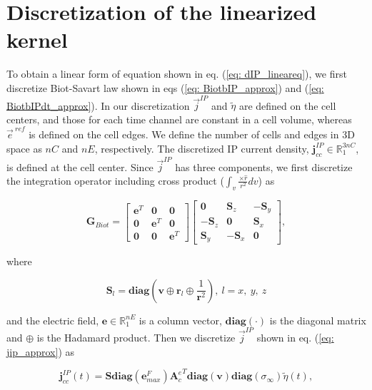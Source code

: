\documentclass[extra,mreferee]{gji}
\newcommand{\siginf}{\sigma_\infty}
\newcommand{\Ace}{{\mathbf A_c^e}}
\newcommand{\diag}{\mathbf{diag}}
\renewcommand {\j}  { {\vec j} }
\newcommand {\e}  { {\vec e} }
\renewcommand {\dj}  { {\mathbf{j} } }
\newcommand {\de}  { {\mathbf{e} } }
\newcommand{\vol}{\mathbf{v}}
\newcommand{\peta}{\tilde{\eta}}
\newcommand{\eref}{\e^{\ ref}}
\begin{document}
\section{Discretization of the linearized kernel}
\label{section:linearkernel_discrete}
To obtain a linear form of equation shown in eq. (\ref{eq: dIP_lineareq}),
we first discretize Biot-Savart law shown in eqs (\ref{eq: BiotbIP_approx}) and (\ref{eq: BiotbIPdt_approx}). In our discretization $\j^{IP}$ and  $\peta$ are defined on the cell centers, and those for each time channel are constant in a cell volume, whereas $\eref$ is defined on the cell edges. 
We define the number of cells and edges in 3D space as $nC$ and $nE$, respectively. The discretized IP current density, $\dj^{IP}_{cc} \in \mathbb{R}^{3nC}_{1}$, is defined at the cell center. Since $\j^{IP}$ has three components, we first discretize the integration operator including cross product ($\int_{v}\frac{ \times \hat{r}}{r^2}dv$) as
\begin{linenomath*}
\begin{equation}
  \mathbf{G}_{Biot} =
  \begin{bmatrix}
       \mathbf{e}^T &  \mathbf{0}   & \mathbf{0}  \\
       \mathbf{0}   &  \mathbf{e}^T & \mathbf{0}  \\
       \mathbf{0}   &  \mathbf{0}   & \mathbf{e}^T
    \end{bmatrix}
  \begin{bmatrix}
       \mathbf{0}     &   \mathbf{S}_z   & -\mathbf{S}_y  \\
      -\mathbf{S}_z   &   \mathbf{0}     &  \mathbf{S}_x  \\
       \mathbf{S}_y   &  -\mathbf{S}_x   &  \mathbf{0}
    \end{bmatrix},
\end{equation}
\end{linenomath*}
where
\begin{linenomath*}
\begin{equation*}
  \mathbf{S}_l =\diag(\mathbf{v}\oplus \mathbf{r}_l \oplus \frac{1}{\mathbf{r}^2}), \ l = x, \ y, \ z
\end{equation*}
\end{linenomath*}
and the electric field, $\mathbf{e} \in \mathbb{R}^{nE}_1$ is a column vector, $\diag(\cdot)$ is the diagonal matrix and $\oplus$ is the Hadamard product. 
Then we discretize $\j^{IP}$ shown in eq. (\ref{eq: jip_approx}) as
\begin{linenomath*}
\begin{equation}
  \dj^{IP}_{cc}(t) = \mathbf{S}\diag(\de^{F}_{max})\Ace^T\diag(\vol)\diag(\siginf)\peta(t),
\end{equation}
\end{linenomath*}
\end{document}
